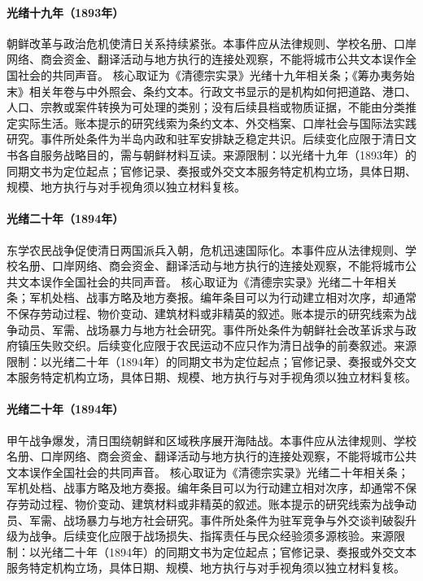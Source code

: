 \hypertarget{civic:EQ-1893-KOREAN-REFORM-CRISIS}{}\paragraph{光绪十九年（1893年）}朝鲜改革与政治危机使清日关系持续紧张。本事件应从法律规则、学校名册、口岸网络、商会资金、翻译活动与地方执行的连接处观察，不能将城市公共文本误作全国社会的共同声音。 核心取证为《清德宗实录》光绪十九年相关条；《筹办夷务始末》相关年卷与中外照会、条约文本。行政文书显示的是机构如何把道路、港口、人口、宗教或案件转换为可处理的类别；没有后续县档或物质证据，不能由分类推定实际生活。账本提示的研究线索为条约文本、外交档案、口岸社会与国际法实践研究。事件所处条件为半岛内政和驻军安排缺乏稳定共识。后续变化应限于清日文书各自服务战略目的，需与朝鲜材料互读。来源限制：以光绪十九年（1893年）的同期文书为定位起点；官修记录、奏报或外交文本服务特定机构立场，具体日期、规模、地方执行与对手视角须以独立材料复核。
\hypertarget{civic:EQ-1894-DONGHAK-PEASANT-WAR}{}\paragraph{光绪二十年（1894年）}东学农民战争促使清日两国派兵入朝，危机迅速国际化。本事件应从法律规则、学校名册、口岸网络、商会资金、翻译活动与地方执行的连接处观察，不能将城市公共文本误作全国社会的共同声音。 核心取证为《清德宗实录》光绪二十年相关条；军机处档、战事方略及地方奏报。编年条目可以为行动建立相对次序，却通常不保存劳动过程、物价变动、建筑材料或非精英的叙述。账本提示的研究线索为战争动员、军需、战场暴力与地方社会研究。事件所处条件为朝鲜社会改革诉求与政府镇压失败交织。后续变化应限于农民运动不应只作为清日战争的前奏叙述。来源限制：以光绪二十年（1894年）的同期文书为定位起点；官修记录、奏报或外交文本服务特定机构立场，具体日期、规模、地方执行与对手视角须以独立材料复核。
\hypertarget{civic:EQ-1894-FIRST-SINO-JAPANESE-WAR}{}\paragraph{光绪二十年（1894年）}甲午战争爆发，清日围绕朝鲜和区域秩序展开海陆战。本事件应从法律规则、学校名册、口岸网络、商会资金、翻译活动与地方执行的连接处观察，不能将城市公共文本误作全国社会的共同声音。 核心取证为《清德宗实录》光绪二十年相关条；军机处档、战事方略及地方奏报。编年条目可以为行动建立相对次序，却通常不保存劳动过程、物价变动、建筑材料或非精英的叙述。账本提示的研究线索为战争动员、军需、战场暴力与地方社会研究。事件所处条件为驻军竞争与外交谈判破裂升级为战争。后续变化应限于战场损失、指挥责任与民众经验须多源核验。来源限制：以光绪二十年（1894年）的同期文书为定位起点；官修记录、奏报或外交文本服务特定机构立场，具体日期、规模、地方执行与对手视角须以独立材料复核。
